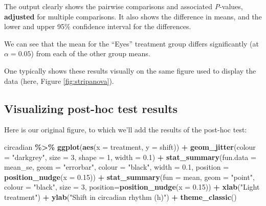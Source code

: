 \documentclass[
]{book}
\newenvironment{Shaded}{\begin{snugshade}}{\end{snugshade}}
\newcommand{\AttributeTok}[1]{\textcolor[rgb]{0.13,0.29,0.53}{#1}}
\newcommand{\DecValTok}[1]{\textcolor[rgb]{0.00,0.00,0.81}{#1}}
\newcommand{\FloatTok}[1]{\textcolor[rgb]{0.00,0.00,0.81}{#1}}
\newcommand{\FunctionTok}[1]{\textcolor[rgb]{0.13,0.29,0.53}{\textbf{#1}}}
\newcommand{\NormalTok}[1]{#1}
\newcommand{\SpecialCharTok}[1]{\textcolor[rgb]{0.81,0.36,0.00}{\textbf{#1}}}
\newcommand{\StringTok}[1]{\textcolor[rgb]{0.31,0.60,0.02}{#1}}
\begin{document}
The output clearly shows the pairwise comparisons and associated \emph{P}-values, \textbf{adjusted} for multiple comparisons. It also shows the difference in means, and the lower and upper 95\% confidence interval for the differences.

We can see that the mean for the ``Eyes'' treatment group differs significantly (at \(\alpha = 0.05\)) from each of the other group means.

One typically shows these results visually on the same figure used to display the data (here, Figure \ref{fig:stripanova}).

\subsection{Visualizing post-hoc test results}\label{vis_tukey}

Here is our original figure, to which we'll add the results of the post-hoc test:

\begin{Shaded}
\begin{Highlighting}[]
\NormalTok{circadian }\SpecialCharTok{\%\textgreater{}\%}
  \FunctionTok{ggplot}\NormalTok{(}\FunctionTok{aes}\NormalTok{(}\AttributeTok{x =}\NormalTok{ treatment, }\AttributeTok{y =}\NormalTok{ shift)) }\SpecialCharTok{+}
  \FunctionTok{geom\_jitter}\NormalTok{(}\AttributeTok{colour =} \StringTok{"darkgrey"}\NormalTok{, }\AttributeTok{size =} \DecValTok{3}\NormalTok{, }\AttributeTok{shape =} \DecValTok{1}\NormalTok{, }\AttributeTok{width =} \FloatTok{0.1}\NormalTok{) }\SpecialCharTok{+}
  \FunctionTok{stat\_summary}\NormalTok{(}\AttributeTok{fun.data =}\NormalTok{ mean\_se, }\AttributeTok{geom =} \StringTok{"errorbar"}\NormalTok{, }
    \AttributeTok{colour =} \StringTok{"black"}\NormalTok{, }\AttributeTok{width =} \FloatTok{0.1}\NormalTok{, }
    \AttributeTok{position =} \FunctionTok{position\_nudge}\NormalTok{(}\AttributeTok{x =} \FloatTok{0.15}\NormalTok{)) }\SpecialCharTok{+}
  \FunctionTok{stat\_summary}\NormalTok{(}\AttributeTok{fun =}\NormalTok{ mean, }\AttributeTok{geom =} \StringTok{"point"}\NormalTok{, }
    \AttributeTok{colour =} \StringTok{"black"}\NormalTok{, }\AttributeTok{size =} \DecValTok{3}\NormalTok{, }
    \AttributeTok{position=}\FunctionTok{position\_nudge}\NormalTok{(}\AttributeTok{x =} \FloatTok{0.15}\NormalTok{)) }\SpecialCharTok{+}
  \FunctionTok{xlab}\NormalTok{(}\StringTok{"Light treatment"}\NormalTok{) }\SpecialCharTok{+} 
  \FunctionTok{ylab}\NormalTok{(}\StringTok{"Shift in circadian rhythm (h)"}\NormalTok{) }\SpecialCharTok{+} 
  \FunctionTok{theme\_classic}\NormalTok{()}
\end{Highlighting}
\end{Shaded}
\end{document}
